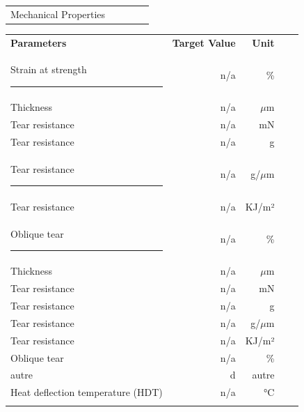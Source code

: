 \documentclass{article}
\begin{document}
\begin{center}
\begin{tabularx}
{\textwidth}{X r  r  r  r }\rowcolor{color_title}Mechanical Properties &  &  &  &  \\

\end{tabularx}\begin{paracol}{2}
\begin{tabularx}{0.5\textwidth}
{X r  r  r  r }\textbf{Parameters} & \textbf{Target Value} & \textbf{Unit} &  &  \\
Strain at strength \rule{80pt}{0pt} & n/a & \% &  &  \\
\arrayrulecolor{line_color}\hline
Thickness & n/a & \(\mu\)m &  &  \\
\arrayrulecolor{line_color}\hline
Tear resistance & n/a & mN &  &  \\
\arrayrulecolor{line_color}\hline
Tear resistance & n/a & g &  &  \\
\arrayrulecolor{line_color}\hline
Tear resistance \rule{80pt}{0pt} & n/a & g/\(\mu\)m &  &  \\
\arrayrulecolor{line_color}\hline
Tear resistance & n/a & KJ/m² &  &  \\
\arrayrulecolor{line_color}\hline
Oblique tear \rule{80pt}{0pt} & n/a & \% &  &  \\
\arrayrulecolor{line_color}\hline
Thickness & n/a & \(\mu\)m &  &  \\
\arrayrulecolor{line_color}\hline
Tear resistance & n/a & mN &  &  \\
\arrayrulecolor{line_color}\hline
Tear resistance & n/a & g &  &  \\
\arrayrulecolor{line_color}\hline
Tear resistance & n/a & g/\(\mu\)m &  &  \\
\arrayrulecolor{line_color}\hline
Tear resistance & n/a & KJ/m² &  &  \\
\arrayrulecolor{line_color}\hline
Oblique tear & n/a & \% &  &  \\
\arrayrulecolor{line_color}\hline
autre & d & autre &  &  \\
\arrayrulecolor{line_color}\hline
Heat deflection temperature (HDT) & n/a & °C &  &  \\
\arrayrulecolor{line_color}\hline


\end{tabularx}
\end{paracol}
\end{center}
\end{document}
